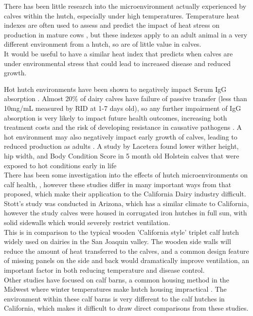\documentclass[12pt]{article}
\begin{document}
	\newpage
	There has been little research into the microenvironment actually experienced by calves within the hutch, especially under high temperatures. 
	Temperature heat indexes are often used to assess and predict the impact of heat stress on production in mature cows \cite{Bohmanova2007}, but these indexes apply to an adult animal in a very different environment from a hutch, so are of little value in calves.\\
	It would be useful to have a similar heat index that predicts when calves are under environmental stress that could lead to increased disease and reduced growth.


	Hot hutch environments have been shown to negatively impact Serum IgG absorption \cite{Stott1976}. Almost 20\% of dairy calves have failure of passive transfer (less than 10mg/mL measured by RID at 1-7 days old)\cite{NAHMS2007}, so any further impairment of IgG absorption is very likely to impact future health outcomes\cite{Besser1994}, increasing both treatment costs and the risk of developing resistance in causative pathogens \cite{Neu1992}.
	A hot environment may also negatively impact early growth of calves, leading to reduced production as adults \cite{Hoffman1997}. A study by  Lacetera found lower wither height, hip width, and Body Condition Score in 5 month old Holstein calves that were exposed to hot conditions early in life \cite{lacetera1994} \\


	There has been some investigation into the effects of hutch microenvironments on calf health, \cite{Stott1976,Nordlund2008,Lago2006}, however these studies differ  in many important ways from that proposed, which make their application to the California Dairy industry difficult.\\ 
	Stott's study was conducted in Arizona, which has a similar climate to California, however the study calves were housed in corrugated iron hutches in full sun, with solid sidewalls which would severely restrict ventilation\cite{Stott1976}. \\
	\newpage
	This is in comparison to the typical wooden 'California style' triplet calf hutch widely used on dairies in the San Joaquin valley. The wooden side walls will reduce the amount of heat transferred to the calves\cite{Physics2012}, and a common design feature of missing panels on the side and back would dramatically improve ventilation, an important factor in both reducing temperature and disease control\cite{Smith2002a}.\\
	Other studies have focused on calf barns, a common housing method in the Midwest where winter temperatures make hutch housing impractical \cite{Lago2006}. The environment within these calf barns is very different to the calf hutches in California, which makes it difficult to draw direct comparisons from these studies.\\
\end{document}
